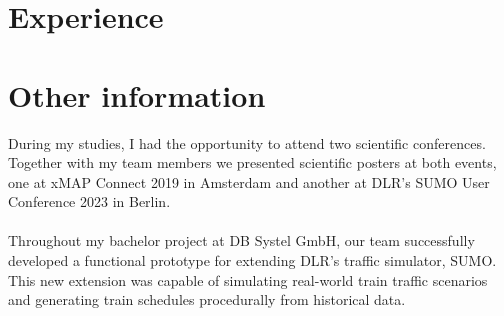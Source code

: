 \documentclass[letterpaper]{twentysecondcv} %
\begin{document}
\section{Experience}

\begin{twenty} %
\end{twenty}


\section{Other information}

During my studies, I had the opportunity to attend two scientific conferences. Together with my team members we presented scientific posters at both events, one at xMAP Connect 2019 in Amsterdam and another at DLR's SUMO User Conference 2023 in Berlin.\\
\\
Throughout my bachelor project at DB Systel GmbH, our team successfully developed a functional prototype for extending DLR's traffic simulator, SUMO. This new extension was capable of simulating real-world train traffic scenarios and generating train schedules procedurally from historical data.
\end{document}
